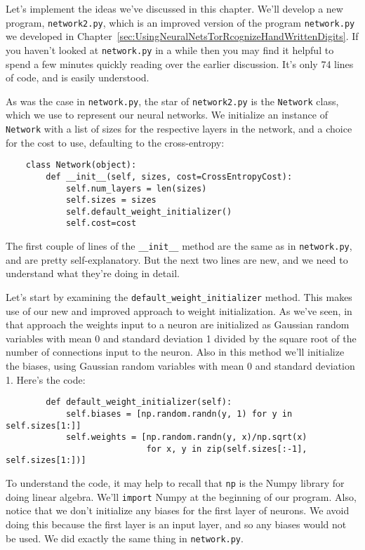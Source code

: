 Let's implement the ideas we've discussed in this chapter. We'll develop a new program, \lstinline{network2.py}, which is an improved version of the program \lstinline{network.py} we developed in 
Chapter~\ref{sec:UsingNeuralNetsTorRcognizeHandWrittenDigits}. If you haven't looked at \lstinline{network.py} in a while then you may find it helpful to spend a few minutes quickly reading over the earlier discussion. It's only 74 lines of code, and is easily understood. 

As was the case in \lstinline{network.py}, the star of \lstinline{network2.py} is the \lstinline{Network} class, which we use to represent our neural networks. We initialize an instance of \lstinline{Network} with a list of sizes for the respective layers in the network, and a choice for the cost to use, defaulting to the cross-entropy:
\begin{lstlisting}
    class Network(object):
        def __init__(self, sizes, cost=CrossEntropyCost):
            self.num_layers = len(sizes)
            self.sizes = sizes
            self.default_weight_initializer()
            self.cost=cost
\end{lstlisting}
The first couple of lines of the \lstinline{__init__} method are the same as in \lstinline{network.py}, and are pretty self-explanatory. But the next two lines are new, and we need to understand what they're doing in detail.

Let's start by examining the \lstinline{default_weight_initializer} method. This makes use of our new and improved approach to weight initialization. As we've seen, in that approach the weights input to a neuron are initialized as Gaussian random variables with mean 0 and standard deviation 1 divided by the square root of the number of connections input to the neuron. Also in this method we'll initialize the biases, using Gaussian random variables with mean 0 and standard deviation 1. Here's the code:
\begin{lstlisting}
        def default_weight_initializer(self):
            self.biases = [np.random.randn(y, 1) for y in self.sizes[1:]]
            self.weights = [np.random.randn(y, x)/np.sqrt(x) 
                            for x, y in zip(self.sizes[:-1], self.sizes[1:])]
\end{lstlisting}                        
To understand the code, it may help to recall that \lstinline{np} is the Numpy library for doing linear algebra. We'll \lstinline{import} Numpy at the beginning of our program. Also, notice that we don't initialize any biases for the first layer of neurons. We avoid doing this because the first layer is an input layer, and so any biases would not be used. We did exactly the same thing in \lstinline{network.py}.


